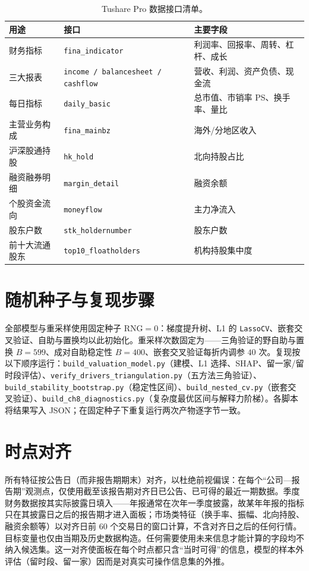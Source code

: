 \documentclass[UTF8, a4paper, fontset=none, zihao=-4]{ctexrep}
\begin{document}
\begin{table}[htbp]
\caption{Tushare Pro 数据接口清单。}
\label{tab:tushare}
\footnotesize
\renewcommand{\arraystretch}{1.35}
\begin{tabular*}{\textwidth}{@{\extracolsep{\fill}}lll@{}}
\toprule
\textbf{\color{brandblue}用途} & \textbf{\color{brandblue}接口} & \textbf{\color{brandblue}主要字段} \\
\midrule
财务指标 & \texttt{fina\_indicator} & 利润率、回报率、周转、杠杆、成长 \\
三大报表 & \texttt{income / balancesheet / cashflow} & 营收、利润、资产负债、现金流 \\
每日指标 & \texttt{daily\_basic} & 总市值、市销率 PS、换手率、量比 \\
主营业务构成 & \texttt{fina\_mainbz} & 海外/分地区收入 \\
沪深股通持股 & \texttt{hk\_hold} & 北向持股占比 \\
融资融券明细 & \texttt{margin\_detail} & 融资余额 \\
个股资金流向 & \texttt{moneyflow} & 主力净流入 \\
股东户数 & \texttt{stk\_holdernumber} & 股东户数 \\
前十大流通股东 & \texttt{top10\_floatholders} & 机构持股集中度 \\
\bottomrule
\end{tabular*}
\end{table}

\section{随机种子与复现步骤}
全部模型与重采样使用固定种子 $\text{RNG}=0$：梯度提升树、L1 的 \texttt{LassoCV}、嵌套交叉验证、自助与置换均以此初始化。重采样次数固定为——三角验证的野自助与置换 $B=599$、成对自助稳定性 $B=400$、嵌套交叉验证每折内调参 $40$ 次。复现按以下顺序运行：\texttt{build\_valuation\_model.py}（建模、L1 选择、SHAP、留一家/留时段评估）、\texttt{verify\_drivers\_triangulation.py}（五方法三角验证）、\texttt{build\_stability\_bootstrap.py}（稳定性区间）、\texttt{build\_nested\_cv.py}（嵌套交叉验证）、\texttt{build\_ch8\_diagnostics.py}（复杂度最优区间与解释力阶梯）。各脚本将结果写入 JSON；在固定种子下重复运行两次产物逐字节一致。

\section{时点对齐}
所有特征按公告日（而非报告期期末）对齐，以杜绝前视偏误：在每个“公司—报告期”观测点，仅使用截至该报告期对齐日已公告、已可得的最近一期数据。季度财务数据按其实际披露日填入——年报通常在次年一季度披露，故某年年报的指标只在其披露日之后的报告期才进入面板；市场类特征（换手率、振幅、北向持股、融资余额等）以对齐日前 $60$ 个交易日的窗口计算，不含对齐日之后的任何行情。目标变量也仅由当期及历史数据构造。任何需要使用未来信息才能计算的字段均不纳入候选集。这一对齐使面板在每个时点都只含“当时可得”的信息，模型的样本外评估（留时段、留一家）因而是对真实可操作信息集的外推。
\end{document}
